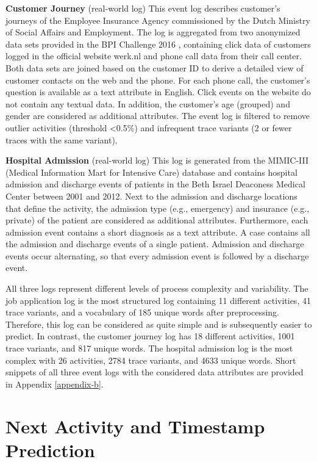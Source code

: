 \textbf{Customer Journey} (real-world log) This event log describes customer's journeys of the Employee Insurance Agency commissioned by the Dutch Ministry of Social Affairs and Employment.
The log is aggregated from two anonymized data sets provided in the BPI Challenge 2016 \cite{bpichallenge2016}, containing click data of customers logged in the official website werk.nl and phone call data from their call center.
Both data sets are joined based on the customer ID to derive a detailed view of customer contacts on the web and the phone.
For each phone call, the customer’s question is available as a text attribute in English.
Click events on the website do not contain any textual data.
In addition, the customer’s age (grouped) and gender are considered as additional attributes.
The event log is filtered to remove outlier activities (threshold <0.5\%) and infrequent trace variants (2 or fewer traces with the same variant).

\textbf{Hospital Admission} (real-world log) This log is generated from the MIMIC-III (Medical Information Mart for Intensive Care) database \cite{johnson2016mimic} and contains hospital admission and discharge events of patients in the Beth Israel Deaconess Medical Center between 2001 and 2012.
Next to the admission and discharge locations that define the activity, the admission type (e.g., emergency) and insurance (e.g., private) of the patient are considered as additional attributes.
Furthermore, each admission event contains a short diagnosis as a text attribute.
A case contains all the admission and discharge events of a single patient.
Admission and discharge events occur alternating, so that every admission event is followed by a discharge event.

All three logs represent different levels of process complexity and variability.
The job application log is the most structured log containing 11 different activities, 41 trace variants, and a vocabulary of 185 unique words after preprocessing.
Therefore, this log can be considered as quite simple and is subsequently easier to predict.
In contrast, the customer journey log has 18 different activities, 1001 trace variants, and 817 unique words.
The hospital admission log is the most complex with 26 activities, 2784 trace variants, and 4633 unique words.
Short snippets of all three event logs with the considered data attributes are provided in Appendix \ref{appendix-b}.

\section{Next Activity and Timestamp Prediction}

